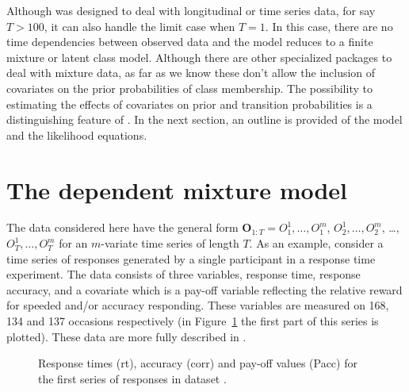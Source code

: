 \documentclass[article]{jss}
\newcommand{\vc}{\mathbf}
\begin{document}
Although  was designed to deal with longitudinal or time
series data, for say $T>100$, it can also handle the limit case when
$T=1$.  In this case, there are no time dependencies between
observed data and the model reduces to a finite mixture or
latent class model. Although there are other specialized packages to
deal with mixture data, as far as we know these 
don't allow the inclusion of covariates on the prior probabilities of
class membership. The possibility to estimating the effects of covariates on 
prior and transition probabilities is a distinguishing feature of 
. In the next section, an outline is provided of the model and 
the likelihood equations.


\section{The dependent mixture model}

The data considered here have the general form $\vc{O}_{1:T}=O_{1}^{1}, \ldots,
O_{1}^{m}$, $O_{2}^{1}, \ldots, O_{2}^{m}$, \ldots, $O_{T}^{1},
\ldots, O_{T}^{m}$ for an $m$-variate time series of length $T$.  As
an example, consider a time series of responses generated by a single
participant in a response time experiment. The data consists of three
variables, response time, response accuracy, and a covariate which is a pay-off
variable reflecting the relative reward for speeded and/or accuracy responding. 
These variables are measured on 168, 134 and 137 occasions respectively (in
Figure~\ref{fig:speed} the first part of this series is plotted). These data
are more fully described in \citet{Dutilh2009}. 

\begin{figure}[htbp]
  \begin{center}
	  \caption{Response times (rt), accuracy (corr) and pay-off values (Pacc) for
	  the first series of responses in dataset .}
	  \label{fig:speed}
  \end{center}
\end{figure}
\end{document}
